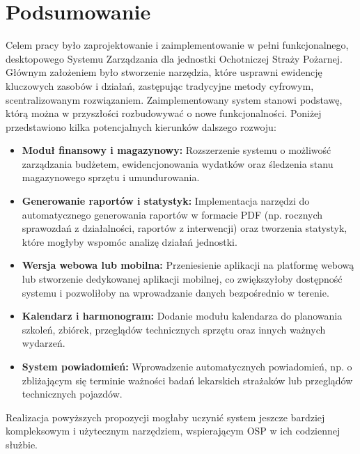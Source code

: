 \chapter{Podsumowanie}
\label{chap:podsumowanie}

Celem pracy było zaprojektowanie i zaimplementowanie w pełni funkcjonalnego, desktopowego Systemu Zarządzania dla jednostki Ochotniczej Straży Pożarnej. Głównym założeniem było stworzenie narzędzia, które usprawni ewidencję kluczowych zasobów i działań, zastępując tradycyjne metody cyfrowym, scentralizowanym rozwiązaniem. Zaimplementowany system stanowi podstawę, którą można w przyszłości rozbudowywać o nowe funkcjonalności. Poniżej przedstawiono kilka potencjalnych kierunków dalszego rozwoju:

\begin{itemize}
    \item \textbf{Moduł finansowy i magazynowy:} Rozszerzenie systemu o możliwość zarządzania budżetem, ewidencjonowania wydatków oraz śledzenia stanu magazynowego sprzętu i umundurowania.
    \item \textbf{Generowanie raportów i statystyk:} Implementacja narzędzi do automatycznego generowania raportów w formacie PDF (np. rocznych sprawozdań z działalności, raportów z interwencji) oraz tworzenia statystyk, które mogłyby wspomóc analizę działań jednostki.
    \item \textbf{Wersja webowa lub mobilna:} Przeniesienie aplikacji na platformę webową lub stworzenie dedykowanej aplikacji mobilnej, co zwiększyłoby dostępność systemu i pozwoliłoby na wprowadzanie danych bezpośrednio w terenie.
    \item \textbf{Kalendarz i harmonogram:} Dodanie modułu kalendarza do planowania szkoleń, zbiórek, przeglądów technicznych sprzętu oraz innych ważnych wydarzeń.
    \item \textbf{System powiadomień:} Wprowadzenie automatycznych powiadomień, np. o zbliżającym się terminie ważności badań lekarskich strażaków lub przeglądów technicznych pojazdów.
\end{itemize}

Realizacja powyższych propozycji mogłaby uczynić system jeszcze bardziej kompleksowym i użytecznym narzędziem, wspierającym OSP w ich codziennej służbie.